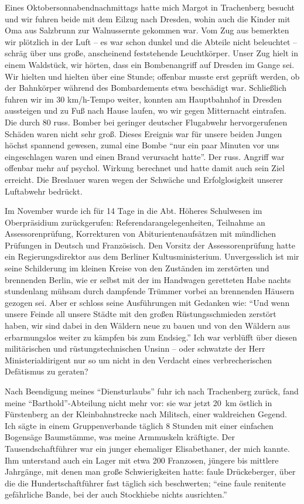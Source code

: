 \documentclass[a5paper,pagesize,10pt,twoside=true]{scrbook}
\renewcommand{\marginpar}[2][]{}
\begin{document}
Eines Oktobersonnabendnachmittags hatte mich Margot in Trachenberg besucht und wir \marginpar{45} fuhren beide mit dem Eilzug nach Dresden, wohin auch die Kinder mit Oma aus Salzbrunn zur Walnussernte gekommen war. Vom Zug aus bemerkten wir plötzlich in der Luft -- es war schon dunkel und die Abteile nicht beleuchtet -- schräg über uns große, anscheinend feststehende Leuchtkörper. Unser Zug hielt in einem Waldstück, wir hörten, dass ein Bombenangriff auf Dresden im Gange sei. Wir hielten und hielten über eine Stunde; offenbar musste erst geprüft werden, ob der Bahnkörper während des Bombardements etwa beschädigt war. Schließlich fuhren wir im 30 km/h-Tempo weiter, konnten am Hauptbahnhof in Dresden aussteigen und zu Fuß nach Hause laufen, wo wir gegen Mitternacht eintrafen. Die durch 80 russ. Bomber bei geringer deutscher Flugabwehr hervorgerufenen Schäden waren nicht sehr groß. Dieses Ereignis war für unsere beiden Jungen höchst spannend gewesen, zumal eine Bombe \enquote{nur ein paar Minuten vor uns eingeschlagen waren und einen Brand verursacht hatte}. Der russ. Angriff war offenbar mehr auf psychol. Wirkung berechnet und hatte damit auch sein Ziel erreicht. Die Breslauer waren wegen der \marginpar{46} Schwäche und Erfolglosigkeit unserer Luftabwehr bedrückt.

Im November wurde ich für 14 Tage in die Abt. Höheres Schulwesen im Oberpräsidium zurückgerufen: Referendarangelegenheiten, Teilnahme an Assessorenprüfung, Korrekturen von Abiturientenaufsätzen mit mündlichen Prüfungen in Deutsch und Französisch. Den Vorsitz der Assessorenprüfung hatte ein Regierungsdirektor aus dem Berliner Kultusministerium. Unvergesslich ist mir seine Schilderung im kleinen Kreise von den Zuständen im zerstörten und brennenden Berlin, wie er selbst mit der im Handwagen geretteten Habe nachts stundenlang mühsam durch dampfende Trümmer vorbei an brennenden Häusern gezogen sei. Aber er schloss seine Ausführungen mit Gedanken wie: \enquote{Und wenn unsere Feinde all unsere Städte mit den großen Rüstungsschmieden zerstört haben, wir sind dabei in den Wäldern neue zu bauen und von den Wäldern aus erbarmungslos weiter zu kämpfen bis zum Endsieg.} Ich war verblüfft über diesen militärischen und rüstungstechnischen Unsinn -- oder schwatzte der Herr Ministerialdirigent nur so um nicht in \marginpar{47} den Verdacht eines verbrecherischen Defätismus zu geraten?

\marginpar{19.10.1976} Nach Beendigung meines \enquote{Diensturlaubs} fuhr ich nach Trachenberg zurück, fand meine \enquote{Barthold}-Abteilung nicht mehr vor: sie war jetzt 20~km östlich in Fürstenberg an der Kleinbahnstrecke nach Militsch, einer waldreichen Gegend. Ich sägte in einem Gruppenverbande täglich 8 Stunden mit einer einfachen Bogensäge Baumstämme, was meine Armmuskeln kräftigte. Der Tausendschaftführer war ein junger ehemaliger Elisabethaner, der mich kannte. Ihm unterstand auch ein Lager mit etwa 200 Franzosen, jüngere bis mittlere Jahrgänge, mit denen man große Schwierigkeiten hatte: faule Drückeberger, über die die Hundertschaftführer fast täglich sich beschwerten; \enquote{eine faule renitente gefährliche Bande, bei der auch Stockhiebe nichts ausrichten.}
\end{document}
